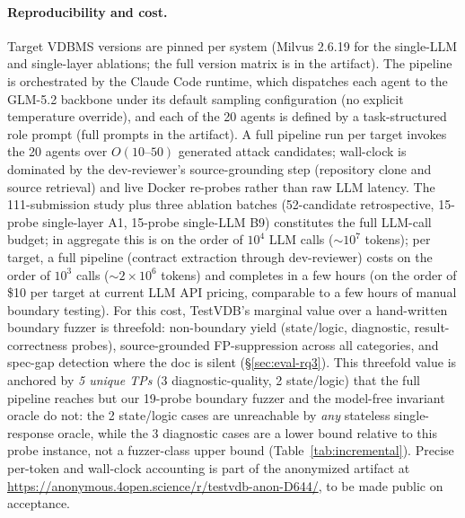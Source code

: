 \documentclass[sigconf]{acmart}
\begin{document}
\paragraph{Reproducibility and cost.} Target VDBMS versions are pinned per system (Milvus 2.6.19 for the single-LLM and single-layer ablations; the full version matrix is in the artifact). The pipeline is orchestrated by the Claude Code runtime, which dispatches each agent to the GLM-5.2 backbone under its default sampling configuration (no explicit temperature override), and each of the 20 agents is defined by a task-structured role prompt (full prompts in the artifact). A full pipeline run per target invokes the 20 agents over $O(10\text{--}50)$ generated attack candidates; wall-clock is dominated by the dev-reviewer's source-grounding step (repository clone and source retrieval) and live Docker re-probes rather than raw LLM latency. The 111-submission study plus three ablation batches (52-candidate retrospective, 15-probe single-layer A1, 15-probe single-LLM B9) constitutes the full LLM-call budget; in aggregate this is on the order of $10^4$ LLM calls ($\sim$$10^7$ tokens); per target, a full pipeline (contract extraction through dev-reviewer) costs on the order of $10^3$ calls ($\sim$$2{\times}10^6$ tokens) and completes in a few hours (on the order of \$10 per target at current LLM API pricing, comparable to a few hours of manual boundary testing). For this cost, TestVDB's marginal value over a hand-written boundary fuzzer is threefold: non-boundary yield (state/logic, diagnostic, result-correctness probes), source-grounded FP-suppression across all categories, and spec-gap detection where the doc is silent (\S\ref{sec:eval-rq3}). This threefold value is anchored by \emph{5 unique TPs} (3 diagnostic-quality, 2 state/logic) that the full pipeline reaches but our 19-probe boundary fuzzer and the model-free invariant oracle do not: the 2 state/logic cases are unreachable by \emph{any} stateless single-response oracle, while the 3 diagnostic cases are a lower bound relative to this probe instance, not a fuzzer-class upper bound (Table~\ref{tab:incremental}). Precise per-token and wall-clock accounting is part of the anonymized artifact at \url{https://anonymous.4open.science/r/testvdb-anon-D644/}, to be made public on acceptance.
\end{document}
